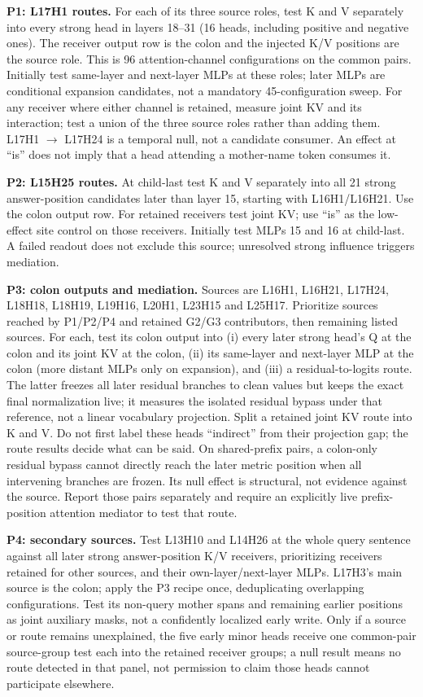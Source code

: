 \documentclass[11pt,a4paper]{article}
\begin{document}
\textbf{P1: L17H1 routes.} For each of its three source roles, test K and V separately
into every strong head in layers 18--31 (16 heads, including positive and negative
ones). The receiver output row is the colon and the injected K/V positions are the
source role. This is 96 attention-channel configurations on the common pairs.
Initially test same-layer and next-layer MLPs at these roles; later MLPs are conditional expansion candidates, not a mandatory 45-configuration sweep.
For any receiver where either channel is retained, measure joint KV and its
interaction; test a union of the three source roles rather than adding them.
L17H1 $\to$ L17H24 is a temporal null, not a candidate consumer. An effect at ``is''
does not imply that a head attending a mother-name token consumes it.

\textbf{P2: L15H25 routes.} At child-last test K and V separately into all 21
strong answer-position candidates later than layer 15, starting with L16H1/L16H21.
Use the colon output row. For retained receivers test joint KV; use ``is'' as the
low-effect site control on those receivers. Initially test MLPs 15 and 16 at child-last.
A failed readout does not exclude this source; unresolved strong influence triggers mediation.

\textbf{P3: colon outputs and mediation.} Sources are L16H1, L16H21, L17H24,
L18H18, L18H19, L19H16, L20H1, L23H15 and L25H17. Prioritize sources reached by P1/P2/P4 and retained G2/G3 contributors, then remaining listed sources. For each, test its colon output
into (i) every later strong head's Q at the colon and its joint KV at the colon,
(ii) its same-layer and next-layer MLP at the colon (more distant MLPs only on expansion), and (iii) a
residual-to-logits route. The latter freezes all later residual branches to clean
values but keeps the exact final normalization live; it measures the isolated
residual bypass under that reference, not a linear vocabulary projection. Split a
retained joint KV route into K and V. Do not first label these heads ``indirect''
from their projection gap; the route results decide what can be said.
On shared-prefix pairs, a colon-only residual bypass cannot directly reach the
later metric position when all intervening branches are frozen. Its null effect is
structural, not evidence against the source. Report those pairs separately and
require an explicitly live prefix-position attention mediator to test that route.

\textbf{P4: secondary sources.} Test L13H10 and L14H26 at the whole query sentence
against all later strong answer-position K/V receivers, prioritizing receivers retained for other sources, and their own-layer/next-layer MLPs.
L17H3's main source is the colon; apply the P3 recipe once, deduplicating overlapping configurations. Test its non-query mother spans and remaining
earlier positions as joint auxiliary masks, not a confidently localized early write.
Only if a source or route remains unexplained, the five early minor heads receive one common-pair source-group test each into the
retained receiver groups; a null result means no route detected in that panel, not
permission to claim those heads cannot participate elsewhere.
\end{document}
